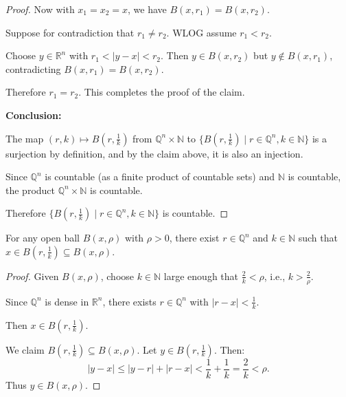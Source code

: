 \documentclass[11pt]{report}
\begin{document}
\begin{proof}
Now with $x_1 = x_2 = x$, we have $B(x, r_1) = B(x, r_2)$.

Suppose for contradiction that $r_1 \neq r_2$. WLOG assume $r_1 < r_2$.

Choose $y \in \mathbb{R}^n$ with $r_1 < |y - x| < r_2$. Then $y \in B(x, r_2)$ but $y \notin B(x, r_1)$, contradicting $B(x, r_1) = B(x, r_2)$.

Therefore $r_1 = r_2$. This completes the proof of the claim.

\textbf{Conclusion:}

The map $(r, k) \mapsto B(r, \frac{1}{k})$ from $\mathbb{Q}^n \times \mathbb{N}$ to $\{B(r, \frac{1}{k}) \mid r \in \mathbb{Q}^n, k \in \mathbb{N}\}$ is a surjection by definition, and by the claim above, it is also an injection.

Since $\mathbb{Q}^n$ is countable (as a finite product of countable sets) and $\mathbb{N}$ is countable, the product $\mathbb{Q}^n \times \mathbb{N}$ is countable.

Therefore $\{B(r, \frac{1}{k}) \mid r \in \mathbb{Q}^n, k \in \mathbb{N}\}$ is countable.
\end{proof}

\begin{lembox}
For any open ball $B(x, \rho)$ with $\rho > 0$, there exist $r \in \mathbb{Q}^n$ and $k \in \mathbb{N}$ such that $x \in B(r, \frac{1}{k}) \subseteq B(x, \rho)$.
\end{lembox}

\begin{proof}
Given $B(x, \rho)$, choose $k \in \mathbb{N}$ large enough that $\frac{2}{k} < \rho$, i.e., $k > \frac{2}{\rho}$.

Since $\mathbb{Q}^n$ is dense in $\mathbb{R}^n$, there exists $r \in \mathbb{Q}^n$ with $|r - x| < \frac{1}{k}$.

Then $x \in B(r, \frac{1}{k})$.

We claim $B(r, \frac{1}{k}) \subseteq B(x, \rho)$. Let $y \in B(r, \frac{1}{k})$. Then:
\[
|y - x| \leq |y - r| + |r - x| < \frac{1}{k} + \frac{1}{k} = \frac{2}{k} < \rho.
\]
Thus $y \in B(x, \rho)$.
\end{proof}
\end{document}

